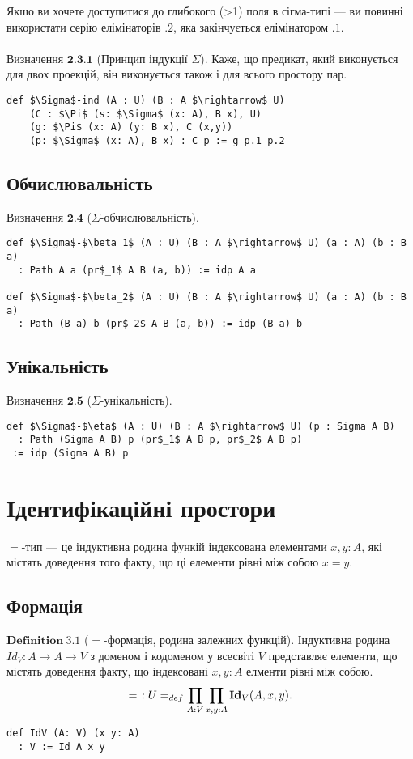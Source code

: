 \documentclass{article}
\theoremstyle{definition}
\begin{document}
Якшо ви хочете доступитися до глибокого (>1) поля в сігма-типі — ви повинні використати
серію елімінаторів $.2$, яка закінчується елімінатором $.1$.
\\
\\
\noindent $\textbf{Визначення\ 2.3.1}$ (Принцип індукції $\Sigma$). Каже, що
предикат, який виконується для двох проекцій, він виконується також і для
всього простору пар.

\begin{lstlisting}[mathescape=true]
def $\Sigma$-ind (A : U) (B : A $\rightarrow$ U)
    (C : $\Pi$ (s: $\Sigma$ (x: A), B x), U)
    (g: $\Pi$ (x: A) (y: B x), C (x,y))
    (p: $\Sigma$ (x: A), B x) : C p := g p.1 p.2
\end{lstlisting}

\subsection{Обчислювальність}

$\textbf{Визначення\ 2.4}$ ($\Sigma$-обчислювальність).
\begin{lstlisting}[mathescape=true]
def $\Sigma$-$\beta_1$ (A : U) (B : A $\rightarrow$ U) (a : A) (b : B a)
  : Path A a (pr$_1$ A B (a, b)) := idp A a

def $\Sigma$-$\beta_2$ (A : U) (B : A $\rightarrow$ U) (a : A) (b : B a)
  : Path (B a) b (pr$_2$ A B (a, b)) := idp (B a) b
\end{lstlisting}

\subsection{Унікальність}

$\textbf{Визначення\ 2.5}$ ($\Sigma$-унікальність).
\begin{lstlisting}[mathescape=true]
def $\Sigma$-$\eta$ (A : U) (B : A $\rightarrow$ U) (p : Sigma A B)
  : Path (Sigma A B) p (pr$_1$ A B p, pr$_2$ A B p)
 := idp (Sigma A B) p
\end{lstlisting}

\newpage
\section{Ідентифікаційні простори}

$=$-тип --- це індуктивна родина функій індексована елементами $x,y : A$,
які містять доведення того факту, що ці елементи рівні між собою $x=y$.

\subsection{Формація}
$\mathbf{Definition\ 3.1}$ ($=$-формація, родина залежних функцій). Індуктивна родина
$Id_V: A \rightarrow A \rightarrow V$ з доменом і кодоменом у всесвіті $V$
представляє елементи, що містять доведення факту, що індексовані $x,y:A$
елменти рівні між собою.
$$
  =\hspace{0.4em} : U =_{def} \prod_{A:V}\prod_{x,y:A} \mathbf{Id}_V(A,x,y).
$$
\begin{lstlisting}[mathescape=true]
def IdV (A: V) (x y: A)
  : V := Id A x y
\end{lstlisting}
\end{document}
